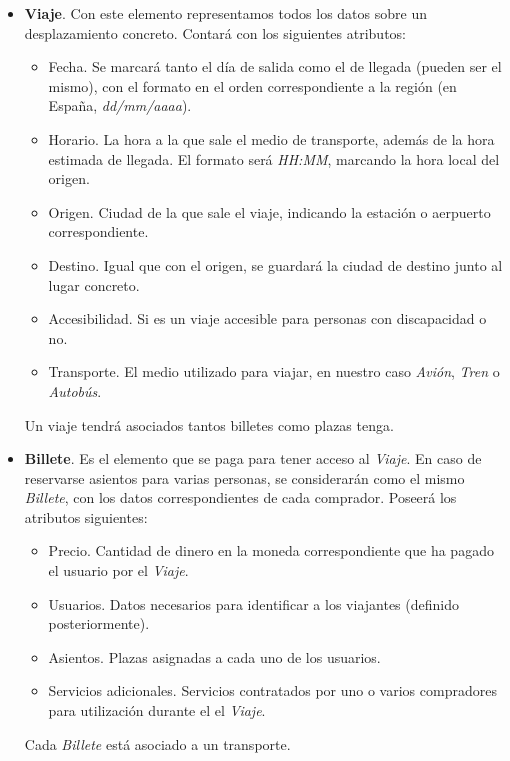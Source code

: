 \begin{itemize}
    \item \textbf{Viaje}. Con este elemento representamos todos los datos sobre un desplazamiento
        concreto. Contará con los siguientes atributos:
        \begin{itemize}
            \item Fecha. Se marcará tanto el día de salida como el de llegada (pueden ser el mismo),
                con el formato en el orden correspondiente a la región (en España, \textit{dd/mm/aaaa}).
            \item Horario. La hora a la que sale el medio de transporte, además de la hora estimada de 
                llegada. El formato será \textit{HH:MM}, marcando la hora local del origen.
            \item Origen. Ciudad de la que sale el viaje, indicando la estación o aerpuerto correspondiente.
            \item Destino. Igual que con el origen, se guardará la ciudad de destino junto al lugar concreto.
            \item Accesibilidad. Si es un viaje accesible para personas con discapacidad o no.
            \item Transporte. El medio utilizado para viajar, en nuestro caso \textit{Avión}, \textit{Tren} o
                \textit{Autobús}.
        \end{itemize}

        Un viaje tendrá asociados tantos billetes como plazas tenga.

    \item \textbf{Billete}. Es el elemento que se paga para tener acceso al \textit{Viaje}. En caso de reservarse asientos
        para varias personas, se considerarán como el mismo \textit{Billete}, con los datos correspondientes de cada comprador.
        Poseerá los atributos siguientes:
        \begin{itemize}
            \item Precio. Cantidad de dinero en la moneda correspondiente que ha pagado el usuario por el \textit{Viaje}.
            \item Usuarios. Datos necesarios para identificar a los viajantes (definido posteriormente).
            \item Asientos. Plazas asignadas a cada uno de los usuarios.
            \item Servicios adicionales. Servicios contratados por uno o varios compradores para utilización durante el
                el \textit{Viaje}.
        \end{itemize}
        Cada \textit{Billete} está asociado a un transporte.


\end{itemize}
